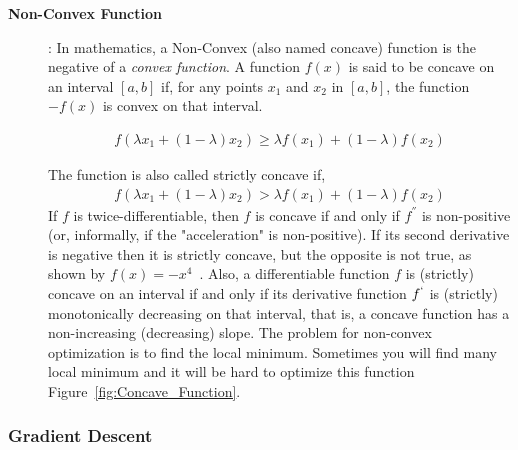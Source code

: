 \begin{description}
\item [\textbf{Non-Convex Function}]: In mathematics, a Non-Convex (also named concave) function is the negative of a \textit{convex function}. A function $f(x)$ is said to be concave on an interval  $[a,b]$ if, for any points $x_1$ and $x_2$ in $[a,b]$, the function  $-f(x)$ is convex on that interval.

\begin{equation}\label{eq:concave_fun}
  \begin{split}
f(\lambda x_1 + (1-\lambda)x_2) \geq \lambda f(x_1) + (1 - \lambda) f(x_2)
  \end{split}
\end{equation}

The function is also called strictly concave if,
\begin{equation}\label{eq:concave_fun_strictly}
  \begin{split}
f(\lambda x_1 + (1-\lambda)x_2) > \lambda f(x_1) + (1 - \lambda) f(x_2)
  \end{split}
\end{equation}
If $f$ is twice-differentiable, then $f$ is concave if and only if $f^{''}$ is non-positive (or, informally, if the "acceleration" is non-positive). If its second derivative is negative then it is strictly concave, but the opposite is not true, as shown by $f(x) = −x^4$~\cite{Wiki_Concave_Function}. Also, a differentiable function $f$ is (strictly) concave on an interval if and only if its derivative function $f^`$ is (strictly) monotonically decreasing on that interval, that is, a concave function has a non-increasing (decreasing) slope. The problem for non-convex optimization is to find the local minimum. Sometimes you will find many local minimum and it will be hard to optimize this function Figure~\ref{fig:Concave_Function}.

%

\end{description}

\subsubsection{Gradient Descent}

